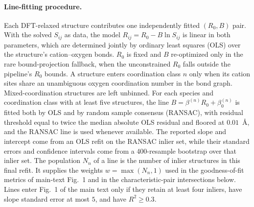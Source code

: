 \documentclass[aps,prmaterials,twocolumn,10pt,superscriptaddress,floatfix]{revtex4-2}
\begin{document}
\paragraph*{Line-fitting procedure.}
Each DFT-relaxed structure contributes one independently fitted
$(R_0,B)$ pair.  With the solved $S_{ij}$ as data, the model
$R_{ij}=R_0-B\ln S_{ij}$ is linear in both parameters, which are
determined jointly by ordinary least squares (OLS) over the
structure's cation--oxygen bonds.  $R_0$ is fixed and $B$ re-optimized
only in the rare bound-projection fallback, when the unconstrained
$R_0$ falls outside the pipeline's $R_0$ bounds.  A structure enters
coordination class $n$ only when its cation sites share an unambiguous
oxygen coordination number in the bond graph.  Mixed-coordination
structures are left unbinned.  For each species and coordination class
with at least five structures, the line $B=\beta^{(n)}R_0+\beta_0^{(n)}$
is fitted both by OLS and by random sample consensus (RANSAC), with
residual threshold equal to twice the median absolute OLS residual and
floored at $0.01$~\AA, and the RANSAC line is used whenever available.
The reported slope and intercept come from an OLS refit on the RANSAC
inlier set, while their standard errors and confidence intervals come
from a 400-resample bootstrap over that inlier set.  The population
$N_n$ of a line is the number of inlier structures in this final
refit.  It supplies the weights $w=\max(N_n,1)$ used in the
goodness-of-fit metrics of main-text Fig.~1 and in the
characteristic-pair intersections below.  Lines enter Fig.~1 of the
main text only if they retain at least four inliers, have slope
standard error at most $5$, and have $R^2\ge 0.3$.
\end{document}
